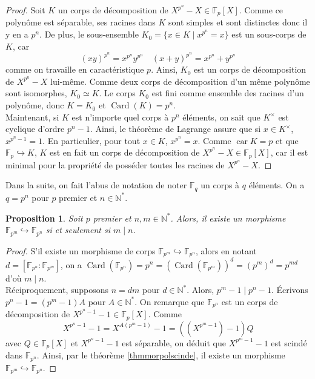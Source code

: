 \documentclass{article}
\newcommand{\N}{\mathbb{N}}
\newcommand{\F}{\mathbb{F}}
\DeclareMathOperator{\Card}{Card}
\DeclareMathOperator{\car}{car}
\theoremstyle{plain}
\newtheorem{proposition}[theorem]{Proposition}
\theoremstyle{definition}
\theoremstyle{remark}
\begin{document}
\begin{proof}
    Soit $K$ un corps de décomposition de $X^{p^n} - X \in \F_p [X]$. Comme ce polynôme est séparable, ses racines dans $K$ sont simples et sont distinctes donc il y en a $p^n$. De plus, le sous-ensemble $K_0 = \{ x\in K \mid x^{p^n} = x\}$ est un sous-corps de $K$, car
    \[(xy)^{p^n} = x^{p^n} y^{p^n} \quad (x+y)^{p^n} = x^{p^n}+y^{p^n}\]
    comme on travaille en caractéristique $p$. Ainsi, $K_0$ est un corps de décomposition de $X^{p^n} - X$ lui-même. Comme deux corps de décomposition d'un même polynôme sont isomorphes, $K_0 \simeq K$. Le corps $K_0$ est fini comme ensemble des racines d'un polynôme, donc $K = K_0$ et $\Card(K) = p^n$. \\
    Maintenant, si $K$ est n'importe quel corps à $p^n$ éléments, on sait que $K^\times$ est cyclique d'ordre $p^n - 1$. Ainsi, le théorème de Lagrange assure que si $x \in K^\times$, $x^{p^n - 1} = 1$. En particulier, pour tout $x \in K$, $x^{p^n} = x$. Comme $\car K = p$ et que $\F_p \hookrightarrow K$, $K$ est en fait un corps de décomposition de $X^{p^n} - X \in \F_p[X]$, car il est minimal pour la propriété de posséder toutes les racines de $X^{p^n} - X$.
\end{proof}

Dans la suite, on fait l'abus de notation de noter $\F_q$ un corps à $q$ éléments. On a $q=p^n$ pour $p$ premier et $n\in \N^*$.

\begin{proposition}
    Soit $p$ premier et $n,m \in \N^*$. Alors, il existe un morphisme $\F_{p^m} \hookrightarrow \F_{p^n}$ si et seulement si $m \mid n$.
\end{proposition}

\begin{proof}
    S'il existe un morphisme de corps $\F_{p^m} \hookrightarrow \F_{p^n}$, alors en notant $d = [\F_{p^n} : \F_{p^m}]$, on a $\Card(\F_{p^n}) = p^n = (\Card(\F_{p^m}))^d = (p^m)^d = p^{md}$ d'où $m \mid n$. \\
    Réciproquement, supposons $n = dm$ pour $d \in \N^*$. Alors, $p^m - 1 \mid p^n - 1$. Écrivons $p^n - 1 = (p^m - 1)A$ pour $A \in \N^*$. On remarque que $\F_{p^n}$ est un corps de décomposition de $X^{p^n - 1} - 1 \in \F_p [X]$. Comme
    \[X^{p^n - 1} - 1 = X^{A(p^m - 1)} - 1 = ((X^{p^m - 1}) - 1)Q\]
    avec $Q \in \F_p [X]$ et $X^{p^n - 1} - 1$ est séparable, on déduit que $X^{p^m - 1} - 1$ est scindé dans $\F_{p^n}$. Ainsi, par le théorème \ref{thmmorpolscinde}, il existe un morphisme $\F_{p^m} \hookrightarrow \F_{p^n}$.
\end{proof}
\end{document}

